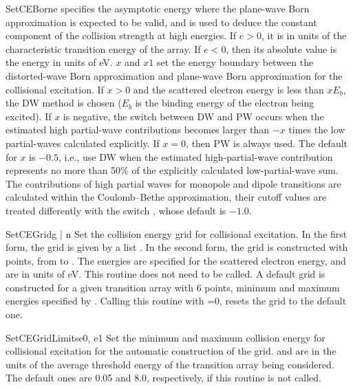 \begin{fundesc}{SetCEBorn}{e}
 specifies the asymptotic energy where the plane-wave Born approximation
is expected to be valid, and is used to deduce the constant component of the
collision strength at high energies. If $e > 0$, it is in units of the
characteristic transition energy of the array. If $e < 0$, then its absolute
value is the energy in units of eV. $x$ and $x1$ set the energy boundary between
the distorted-wave Born approximation and plane-wave Born approximation for the
collisional excitation. If $x > 0$ and the scattered electron energy is less
than $xE_{b}$, the DW method is chosen ($E_{b}$ is the binding energy of the
electron being excited). If $x$ is negative, the switch between DW and PW occurs
when the estimated high partial-wave contributions becomes larger than $-x$
times the low partial-waves calculated explicitly. If $x=0$, then PW is always
used. The default for $x$ is $-0.5$, i.e., use DW when the estimated
high-partial-wave contribution represents no more than 50\% of the explicitly
calculated low-partial-wave sum. The contributions of high partial waves for
monopole and dipole transitions are calculated within the Coulomb--Bethe
approximation, their cutoff values are treated differently with the switch
, whose default is $-1.0$.
\end{fundesc}

\begin{fundesc}{SetCEGrid}{g $\mid$ n}
Set the collision energy grid for collisional excitation. In the first form, the
grid is given by a list . In the second form, the grid is constructed
with  points, from  to . The energies are specified for
the scattered electron energy, and are in units of eV. This routine does not
need to be called. A default grid is constructed for a given transition array
with 6 points, minimum and maximum energies specified by
. Calling this routine with =0, resets the grid
to the default one.
\end{fundesc}

\begin{fundesc}{SetCEGridLimits}{e0, e1}
Set the minimum and maximum collision energy for collisional excitation for the
automatic construction of the grid.  and  are in the units of
the average threshold energy of the transition array being considered. The
default ones are 0.05 and 8.0, respectively, if this routine is not called.
\end{fundesc}

